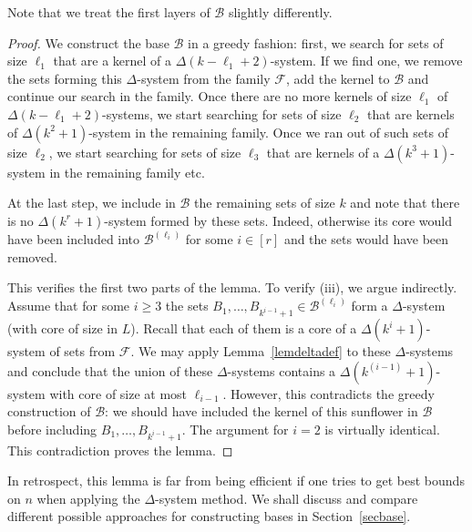 \documentclass[graybox]{svmult}
\renewcommand{\ge}{\geqslant}
\newcommand{\ff}{\mathcal{F}}
\newcommand{\m}{\mathcal}
\begin{document}
Note that we treat the first layers of $\m B$ slightly differently.
\begin{proof}
  We construct the base $\m B$ in a greedy fashion: first, we search for sets of size $\ell_1$ that are a kernel of a $\Delta(k-\ell_1+2)$-system. If we find one, we remove the sets forming this $\Delta$-system from the family $\ff$, add the kernel to $\m B$ and continue our search in the family. Once there are no more kernels of size $\ell_1$ of $\Delta(k-\ell_1+2)$-systems, we start searching for sets of size $\ell_2$ that are kernels of $\Delta(k^2+1)$-system in the remaining family. Once we ran out of such sets of size $\ell_2$, we start searching for sets of size $\ell_3$ that are kernels of a $\Delta(k^3+1)$-system in the remaining family etc.

  At the last step, we include in $\m B$ the remaining sets of size $k$ and note that there is no $\Delta(k^{r}+1)$-system formed by these sets. Indeed, otherwise its core would have been included into $\m B^{(\ell_i)}$ for some $i\in[r]$ and the sets would have been removed.

  This verifies the first two parts of the lemma. %
  To verify (iii), we argue indirectly. Assume that for some $i\ge 3$ the sets $B_1,\ldots, B_{k^{i-1}+1}\in \m B^{(\ell_i)}$ form a $\Delta$-system (with core of size in $L$). Recall that each of them is a core of a $\Delta(k^i+1)$-system of sets from $\m F$. We may apply  Lemma~\ref{lemdeltadef} to these $\Delta$-systems and conclude that the union of these $\Delta$-systems contains a $\Delta(k^{(i-1)}+1)$-system with core of size at most $\ell_{i-1}$. However, this contradicts the greedy construction of $\m B$: we should have included the kernel of this sunflower in $\m B$ before including $B_1,\ldots, B_{k^{i-1}+1}$. The argument for $i=2$ is virtually identical. This contradiction proves the lemma.
\end{proof}

In retrospect, this lemma is far from being efficient if one tries to get best bounds on $n$ when applying the $\Delta$-system method. We shall discuss and compare different possible approaches for constructing bases in Section~\ref{secbase}.
\end{document}
